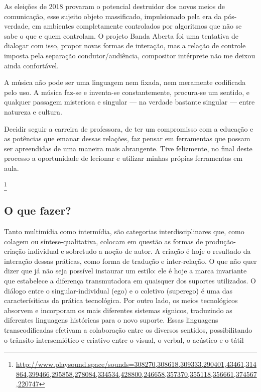 As eleições de 2018 provaram o potencial destruidor dos novos meios de comunicação, esse sujeito objeto massificado, impulsionado pela era da pós-verdade, em ambientes completamente controlados por algoritmos que não se sabe o que e quem controlam. O projeto Banda Aberta foi uma tentativa de dialogar com isso, propor novas formas de interação, mas a relação de controle imposta pela separação condutor/audiência, compositor intérprete não me deixou ainda confortável. 

\begin{citacao}
A música não pode ser uma linguagem nem fixada, nem meramente codificada pelo uso. A música faz-se e inventa-se constantemente, procura-se um sentido, e qualquer passagem misteriosa e singular — na verdade bastante singular — entre natureza e
cultura. \cite{Schaeffer2007}
\end{citacao}


Decidir seguir a carreira de professora, de ter um compromisso com a educação e as potências que emanar dessas relações, faz pensar em ferramentas que possam ser apreendidas de uma maneira mais abrangente. Tive felizmente, no final deste processo a oportunidade de lecionar e utilizar minhas própias ferramentas em aula.


\footnote{\url{http://www.playsound.space/sounds=308270,308618,309333,290401,43461,314864,399466,295858,278084,334534,428800,246658,357370,355118,356661,374567,220747}}









\subsection{O que fazer?} 

\begin{citacao}
Tanto multimídia como intermídia, são categorias interdisciplinares que, como colagem ou síntese-qualitativa, colocam em questão as formas de produção-criação individual e sobretudo a noção de autor. A criação é hoje o resultado da interação dessas práticas, como forma de tradução e inter-relação. O que não quer dizer que já não seja possível instaurar um estilo: ele é hoje a marca invariante que estabelece a diferença transmutadora em quaisquer dos suportes utilizados. O diálogo entre o singular-individual (ego) e o coletivo (superego) é uma das caracterísiticas da prática tecnológica. Por outro lado, os meios tecnológicos absorvem e incorporam os mais diferentes sistemas sígnicos, traduzindo as diferentes linguagens históricas para o novo suporte. Essas linguagens transcodificadas efetivam a colaboração entre os diversos sentidos, possibilitando o trânsito intersemiótico e criativo entre o visual, o verbal, o acústico e o tátil \cite[66]{JulioPlaza1969}
\end{citacao}

